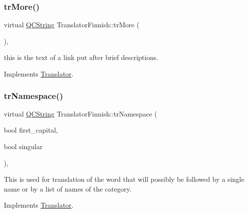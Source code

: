 \mbox{\label{class_translator_finnish_a5106ec0324cf071415ef9cdcdeb297b7}} 
\subsubsection{\texorpdfstring{trMore()}{trMore()}}
{\footnotesize\ttfamily virtual \mbox{\hyperlink{class_q_c_string}{Q\+C\+String}} Translator\+Finnish\+::tr\+More (\begin{DoxyParamCaption}{ }\end{DoxyParamCaption})\hspace{0.3cm}{\ttfamily [inline]}, {\ttfamily [virtual]}}

this is the text of a link put after brief descriptions. 

Implements \mbox{\hyperlink{class_translator}{Translator}}.

\mbox{\label{class_translator_finnish_a11dad360740183498848542ac7a1c4c5}} 
\subsubsection{\texorpdfstring{trNamespace()}{trNamespace()}}
{\footnotesize\ttfamily virtual \mbox{\hyperlink{class_q_c_string}{Q\+C\+String}} Translator\+Finnish\+::tr\+Namespace (\begin{DoxyParamCaption}\item[{bool}]{first\+\_\+capital,  }\item[{bool}]{singular }\end{DoxyParamCaption})\hspace{0.3cm}{\ttfamily [inline]}, {\ttfamily [virtual]}}

This is used for translation of the word that will possibly be followed by a single name or by a list of names of the category. 

Implements \mbox{\hyperlink{class_translator}{Translator}}.

\mbox{\label{class_translator_finnish_a60effbb78fa1f23554ee5789abfe9db7}} 

